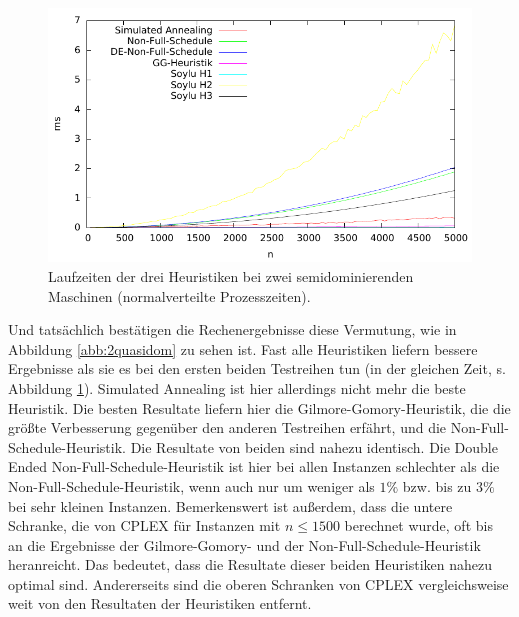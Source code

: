 \documentclass{scrreprt}
\begin{document}
\begin{figure}
    \begin{center}
        \includegraphics[width=.8\textwidth]{../instances/2quasidom/plottime.pdf}
    \end{center}
    \caption{
        \label{abb:2quasidomtime}
        Laufzeiten der drei Heuristiken bei zwei semidominierenden Maschinen (normalverteilte Prozesszeiten).
    }
\end{figure}

Und tatsächlich bestätigen die Rechenergebnisse diese Vermutung, wie in Abbildung \ref{abb:2quasidom} zu sehen ist.
Fast alle Heuristiken liefern bessere Ergebnisse als sie es bei den ersten beiden Testreihen tun (in der gleichen Zeit, s. Abbildung \ref{abb:2quasidomtime}).
Simulated Annealing ist hier allerdings nicht mehr die beste Heuristik.
Die besten Resultate liefern hier die Gilmore-Gomory-Heuristik, die die größte Verbesserung gegenüber den anderen Testreihen erfährt, 
und die Non-Full-Schedule-Heuristik. Die Resultate von beiden sind nahezu identisch.
Die Double Ended Non-Full-Schedule-Heuristik ist hier bei allen Instanzen schlechter als die Non-Full-Schedule-Heuristik, wenn auch nur um weniger als $1\%$
bzw. bis zu $3\%$ bei sehr kleinen Instanzen.
Bemerkenswert ist außerdem, dass die untere Schranke, die von CPLEX für Instanzen mit $n\leq 1500$ berechnet wurde,
oft bis an die Ergebnisse der Gilmore-Gomory- und der Non-Full-Schedule-Heuristik heranreicht.
Das bedeutet, dass die Resultate dieser beiden Heuristiken nahezu optimal sind.
Andererseits sind die oberen Schranken von CPLEX vergleichsweise weit von den Resultaten der Heuristiken entfernt.
\end{document}
